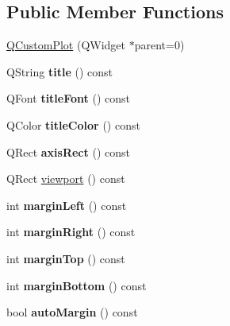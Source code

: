 \subsection*{Public Member Functions}
\begin{DoxyCompactItemize}
\item 
\hyperlink{classQCustomPlot_a45b99626558651a6428b83972b0b34b8}{Q\-Custom\-Plot} (Q\-Widget $\ast$parent=0)
\item 
\hypertarget{classQCustomPlot_ac493fc4c0eec2bbcbd9876f9792411dd}{Q\-String {\bfseries title} () const }\label{classQCustomPlot_ac493fc4c0eec2bbcbd9876f9792411dd}

\item 
\hypertarget{classQCustomPlot_ac538b61f04b2bc0957bfd4faf2a6ab3f}{Q\-Font {\bfseries title\-Font} () const }\label{classQCustomPlot_ac538b61f04b2bc0957bfd4faf2a6ab3f}

\item 
\hypertarget{classQCustomPlot_af5965492ad9ba004d5836527f04c4d8d}{Q\-Color {\bfseries title\-Color} () const }\label{classQCustomPlot_af5965492ad9ba004d5836527f04c4d8d}

\item 
\hypertarget{classQCustomPlot_a4a31c39953a7050955ea97eb9e06078c}{Q\-Rect {\bfseries axis\-Rect} () const }\label{classQCustomPlot_a4a31c39953a7050955ea97eb9e06078c}

\item 
Q\-Rect \hyperlink{classQCustomPlot_a953ecdbc28018e7e84cb6213ad3d88c2}{viewport} () const 
\item 
\hypertarget{classQCustomPlot_a27948baca993af48e2396dff972ab36c}{int {\bfseries margin\-Left} () const }\label{classQCustomPlot_a27948baca993af48e2396dff972ab36c}

\item 
\hypertarget{classQCustomPlot_a81da0b8b6bfecd5ced810e01378102eb}{int {\bfseries margin\-Right} () const }\label{classQCustomPlot_a81da0b8b6bfecd5ced810e01378102eb}

\item 
\hypertarget{classQCustomPlot_ad97e3ebab105b5d8ba93ee4007a42a0c}{int {\bfseries margin\-Top} () const }\label{classQCustomPlot_ad97e3ebab105b5d8ba93ee4007a42a0c}

\item 
\hypertarget{classQCustomPlot_a3bd95522dbcdf4dd4f95d984d4c03878}{int {\bfseries margin\-Bottom} () const }\label{classQCustomPlot_a3bd95522dbcdf4dd4f95d984d4c03878}

\item 
\hypertarget{classQCustomPlot_a47b3e8045b9ad74e1cc212564e8e4504}{bool {\bfseries auto\-Margin} () const }\label{classQCustomPlot_a47b3e8045b9ad74e1cc212564e8e4504}


\end{DoxyCompactItemize}
